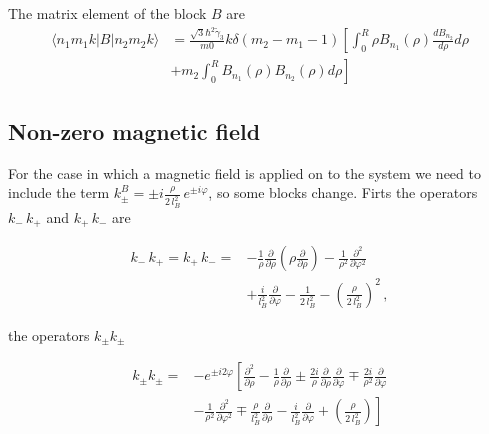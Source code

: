 \documentclass[12pt,a4paper]{article}
\begin{document}
The matrix element of the block $B$ are
\begin{equation}
\begin{split}
  \langle n_1 m_1 k|B|n_2 m_2 k\rangle &= \frac{\sqrt{3}\hbar^2\tilde{\gamma}_3}{m0}
  k \delta(m_2-m_1-1)\left[\int_0^R \rho B_{n_1}(\rho) \frac{dB_{n_2}}{d\rho} d\rho \right.\\
  & \left.+ m_2 \int_0^R B_{n_1}(\rho) B_{n_2}(\rho) d\rho \right]
\end{split}
\end{equation}

\subsection{Non-zero magnetic field}

For the case in which a magnetic field is applied on to the system we need to
include the term $k_{\pm}^B = \pm i \frac{\rho}{2\,l_B^2}\,e^{\pm i \varphi}$,
so some blocks change. Firts the operators $k_-\,k_+$ and $k_+\,k_-$ are

\begin{equation}
  \begin{split}
    k_-\,k_+ = k_+\,k_- =& -\frac{1}{\rho}\frac{\partial}{\partial \rho}
                          \left(\rho \frac{\partial}{\partial \rho}\right) -
                          \frac{1}{\rho^2}\frac{\partial^2}{\partial \varphi^2} \\
                         & + \frac{i}{l_B^2} \frac{\partial}{\partial \varphi}
                         -\frac{1}{2\,l_B^2}-\left(\frac{\rho}{2\,l_B^2}\right)^2\,,
  \end{split}
\end{equation}

\noindent the operators $k_{\pm}k_{\pm}$

\begin{equation}
  \begin{split}
    k_{\pm}k_{\pm} =& -e^{\pm i 2\varphi}\left[\frac{\partial^2}{\partial \rho}
                    - \frac{1}{\rho}\frac{\partial}{\partial \rho}
                    \pm \frac{2i}{\rho}\frac{\partial}{\partial \rho}\frac{\partial}{\partial \varphi}
                    \mp \frac{2i}{\rho^2}\frac{\partial}{\partial\varphi}\right. \\
                    &\left.-\frac{1}{\rho^2}\frac{\partial^2}{\partial \varphi^2}
                    \mp\frac{\rho}{l_B^2}\frac{\partial}{\partial \rho}
                    -\frac{i}{l_B^2}\frac{\partial}{\partial \varphi}
                    +\left(\frac{\rho}{2\,l_B^2}\right)\right]\,\,
  \end{split}
\end{equation}
\end{document}
